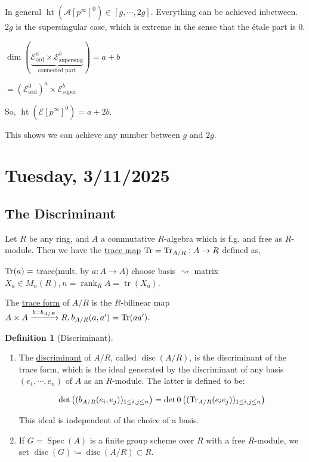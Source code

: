 \documentclass{article}
\theoremstyle{definition}
\newtheorem*{definition}{Definition}
\numberwithin{theorem}{subsection}
\begin{document}
    In general \(\operatorname{ht}(\mathscr{A}[p^{\infty}]^0) \in [g, \cdots , 2g]\). Everything can be achieved inbetween. \(2g\) is the supersingular case, which is extreme in the sense that the \'etale part is \(0\).

    \(\dim \left( \underbrace{\mathscr{E}_{\text{ord}}^a \times \mathscr{E}_{\text{supersing}}^b}_{\text{connected part} } \right) = a+b\)
    
    \(= (\mathscr{E}^0_{\text{ord}})^a \times \mathscr{E}_{\text{super}}^b\)
    
    So, \(\operatorname{ht}(\mathscr{E}[p^{\infty}]^0) = a + 2b\).

    This shows we can achieve any number between \(g\) and \(2g\).

    \section*{Tuesday, 3/11/2025}
    
    \subsection*{The Discriminant}

    Let \(R\) be any ring, and \(A\) a commutative \(R\)-algebra which is f.g. and free as \(R\)-module. Then we have the \underline{trace map} \(\Tr = \Tr_{A / R}: A \to R\) defined as,

    \(\Tr(a) =\) trace(mult. by \(a: A \to A\)) choose basis \(\rightsquigarrow\) matrix \(X_a \in M_n(R), n = \operatorname{rank} _R A = \operatorname{tr}(X_a)\).
    
    The \underline{trace form} of \(A / R\) is the \(R\)-bilinear map \(A \times A \xrightarrow{b = b_{A / R}} R, b_{A / R}(a, a^{\prime}) = \Tr (aa^{\prime})\).
    
    \begin{definition}
        [Discriminant]
        
        \begin{enumerate}[label=\arabic*)]
            \item  The \underline{discriminant} of \(A / R\), called \(\operatorname{disc}(A / R)\), is the discriminant of the trace form, which is the ideal generated by the discriminant of any basis \((e_1, \cdots , e_n)\) of \(A\) as an \(R\)-module. The latter is defined to be:

            \[
                \det \left( (b_{A / R} (e_i, e_j))_{1 \leq i,j \leq n} \right) = \det 0\left( (\Tr_{A / R}(e_i e_j))_{1 \leq i,j \leq n} \right)  
            \]

            This ideal is independent of the choice of a basis.
            \item If \(G = \operatorname{Spec}(A)\) is a finite group scheme over \(R\) with a free \(R\)-module, we set \(\operatorname{disc}(G) \coloneqq \operatorname{disc}(A / R) \subset R\). 
        \end{enumerate} 
    \end{definition}
\end{document}
